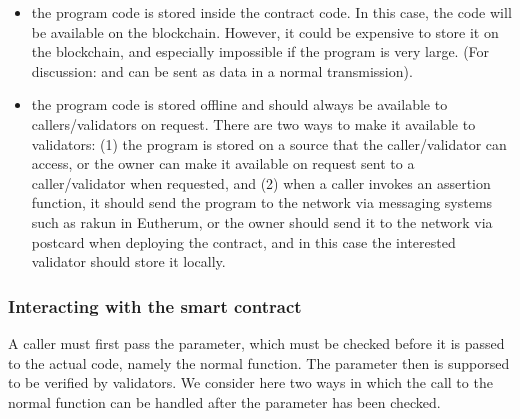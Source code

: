 \documentclass[runningheads]{llncs}
\begin{document}
\begin{itemize} 
\item the program code is stored inside the contract code. In this case, the code will be available on the blockchain. However, it could be expensive to store it on the blockchain, and especially impossible if the program is very large. (For discussion: and can be sent as data in a normal transmission). 
\item the program code is stored offline and should always be available to callers/validators on request. There are two ways to make it available to validators: (1) the program is stored on a source that the caller/validator can access, or the owner can make it available on request sent to a caller/validator when requested, and (2) when a caller invokes an assertion function, it should send the program to the network via messaging systems such as rakun in Eutherum, or the owner should send it to the network via postcard when deploying the contract, and in this case the interested validator should store it locally. \end{itemize}



\subsubsection{Interacting with the smart contract}
A caller must first pass the parameter, which must be checked before it is passed to the actual code, namely the normal function. The parameter then is supporsed to be verified by validators. We consider here two ways in which the call to the normal function can be handled after the parameter has been checked. 
\end{document}
